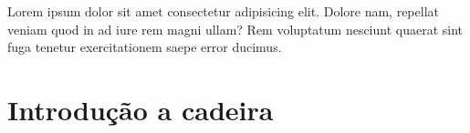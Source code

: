 Lorem ipsum dolor sit amet consectetur adipisicing elit. Dolore nam, repellat veniam quod in ad iure rem magni ullam? Rem voluptatum nesciunt quaerat sint fuga tenetur exercitationem saepe error ducimus.%

\setcounter{part}{0}
\part{Introdução a cadeira}









